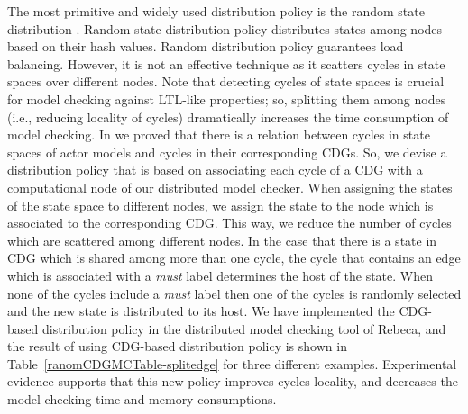 The most primitive and widely used distribution policy is the random state distribution \cite{DBLP:journals/entcs/GaravelMS13}. Random state distribution policy distributes states among nodes based on their hash values. Random distribution policy guarantees load balancing. However, it is not an effective technique as it scatters cycles in state spaces over different nodes. Note that detecting cycles of state spaces is crucial for model checking against LTL-like properties; so, splitting them among nodes (i.e., reducing locality of cycles) dramatically increases the time consumption of model checking. %
%
In \cite{DBLP:journals/eceasst/KhamespanahSMSR15} we proved that there is a relation between cycles in state spaces of actor models 
and cycles in their corresponding CDGs.
So, we devise a distribution policy that is based on
associating each cycle of a CDG with a computational node of our distributed model checker. When assigning the states of the state space to different nodes, we assign the state to the node which is associated to the corresponding CDG. This way, we reduce the number of cycles which are scattered among different nodes.
%
In the case that there is a state in CDG which is shared among more than one cycle, the cycle that contains an edge which is associated with a \emph{must} label determines the host of the state. 
%
When none of the cycles include a \emph{must} label then one of the cycles is randomly selected and the new state is distributed to its host. 
%
We have implemented the CDG-based distribution policy in the distributed model checking tool of Rebeca, and the result of using CDG-based distribution policy is shown in Table~\ref{ranomCDGMCTable-splitedge} for three different examples. Experimental evidence supports that this new policy improves cycles locality, and decreases the model checking time and memory consumptions. %

